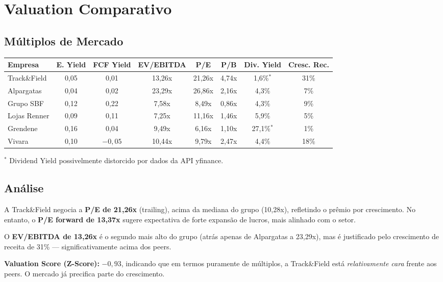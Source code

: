 \documentclass[12pt, a4paper]{article}
\begin{document}
\section{Valuation Comparativo}

\subsection{Múltiplos de Mercado}

\begin{center}
\small
\begin{tabular}{lccccccc}
\toprule
\textbf{Empresa} & \textbf{E. Yield} & \textbf{FCF Yield} & \textbf{EV/EBITDA} & \textbf{P/E} & \textbf{P/B} & \textbf{Div. Yield} & \textbf{Cresc. Rec.} \\
\midrule
\rowcolor{cinzatabela}
Track\&Field & 0,05 & 0,01 & 13,26x & 21,26x & 4,74x & 1,6\%$^*$ & 31\% \\
Alpargatas & 0,04 & 0,02 & 23,29x & 26,86x & 2,16x & 4,3\% & 7\% \\
\rowcolor{cinzatabela}
Grupo SBF & 0,12 & 0,22 & 7,58x & 8,49x & 0,86x & 4,3\% & 9\% \\
Lojas Renner & 0,09 & 0,11 & 7,25x & 11,16x & 1,46x & 5,9\% & 5\% \\
\rowcolor{cinzatabela}
Grendene & 0,16 & 0,04 & 9,49x & 6,16x & 1,10x & 27,1\%$^*$ & 1\% \\
Vivara & 0,10 & $-0,05$ & 10,44x & 9,79x & 2,47x & 4,4\% & 18\% \\
\bottomrule
\end{tabular}
\end{center}
{\footnotesize $^*$ Dividend Yield possivelmente distorcido por dados da API yfinance.}

\subsection{Análise}

A Track\&Field negocia a \textbf{P/E de 21,26x} (trailing), acima da mediana do grupo (10,28x), refletindo o prêmio por crescimento. No entanto, o \textbf{P/E forward de 13,37x} sugere expectativa de forte expansão de lucros, mais alinhado com o setor.

O \textbf{EV/EBITDA de 13,26x} é o segundo mais alto do grupo (atrás apenas de Alpargatas a 23,29x), mas é justificado pelo crescimento de receita de 31\% --- significativamente acima dos peers.

\textbf{Valuation Score (Z-Score):} $-0,93$, indicando que em termos puramente de múltiplos, a Track\&Field está \textit{relativamente cara} frente aos peers. O mercado já precifica parte do crescimento.
\end{document}
